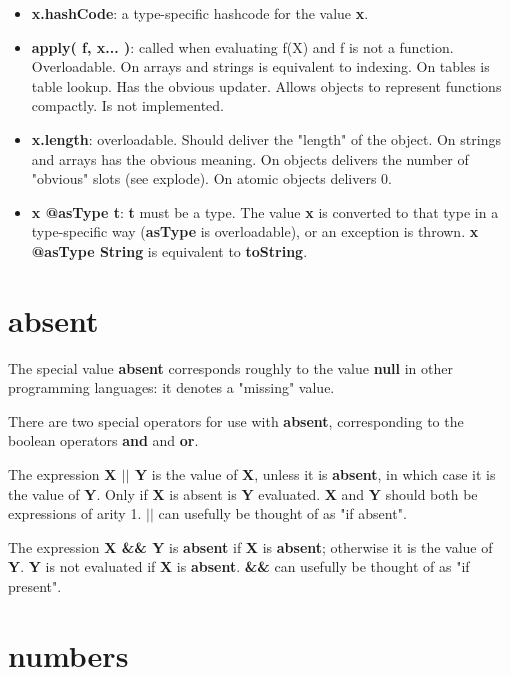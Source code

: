 \documentclass{report}
\begin{document}
\begin{itemize}
\item {\bf x.hashCode}:
    a type-specific hashcode for the value {\bf x}.

\item {\bf apply( f, x... )}:
    called when evaluating f(X) and f is not a function. Overloadable.
    On arrays and strings is equivalent to indexing. On tables is
    table lookup. Has the obvious updater. Allows objects to represent
    functions compactly. Is not implemented.

\item {\bf x.length}:
    overloadable. Should deliver the "length" of the object. On
    strings and arrays has the obvious meaning. On objects delivers
    the number of "obvious" slots (see explode). On atomic objects
    delivers 0.

\item {\bf x @asType t}:
    {\bf t} must be a type. The value {\bf x} is converted to that type in a
    type-specific way ({\bf asType} is overloadable), or an exception is thrown.
    {\bf x @asType String} is equivalent to {\bf toString}.

\end{itemize}

\section{absent}


The special value {\bf absent} corresponds roughly to the value {\bf null} in
other programming languages: it denotes a "missing" value.

There are two special operators for use with {\bf absent}, corresponding to the
boolean operators {\bf and} and {\bf or}.

The expression {\bf X $\mid$$\mid$ Y} is the value of {\bf X}, unless it is {\bf absent}, in which
case it is the value of {\bf Y}. Only if {\bf X} is absent is {\bf Y} evaluated. {\bf X} and
{\bf Y} should both be expressions of arity 1. {\bf $\mid$$\mid$} can usefully be thought of
as "if absent".

The expression {\bf X \&\& Y} is {\bf absent} if {\bf X} is {\bf absent}; otherwise it is the
value of {\bf Y}. {\bf Y} is not evaluated if {\bf X} is {\bf absent}. {\bf \&\&} can usefully be
thought of as "if present".

\section{numbers}
\end{document}
